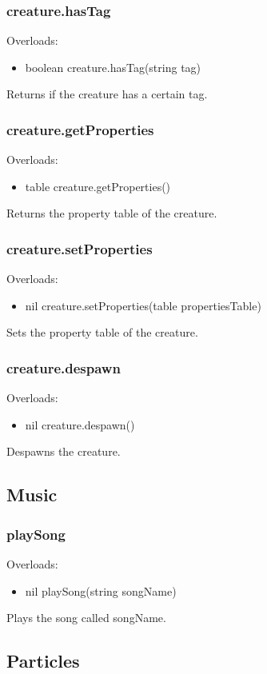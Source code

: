 \documentclass{book}
\newenvironment{ulist}
	{\begin{itemize}
			\itemsep0em}
	{\end{itemize}}
\begin{document}
\subsubsection{creature.hasTag}
Overloads:
\begin{ulist}
	\item boolean creature.hasTag(string tag)
\end{ulist}
Returns if the creature has a certain tag.

\subsubsection{creature.getProperties}
Overloads:
\begin{ulist}
	\item table creature.getProperties()
\end{ulist}
Returns the property table of the creature.

\subsubsection{creature.setProperties}
Overloads:
\begin{ulist}
	\item nil creature.setProperties(table propertiesTable)
\end{ulist}
Sets the property table of the creature.

\subsubsection{creature.despawn}
Overloads:
\begin{ulist}
	\item nil creature.despawn()
\end{ulist}
Despawns the creature.

\subsection{Music}
\subsubsection{playSong}
Overloads:
\begin{ulist}
	\item nil playSong(string songName)
\end{ulist}
Plays the song called songName.


\subsection{Particles}
\end{document}
